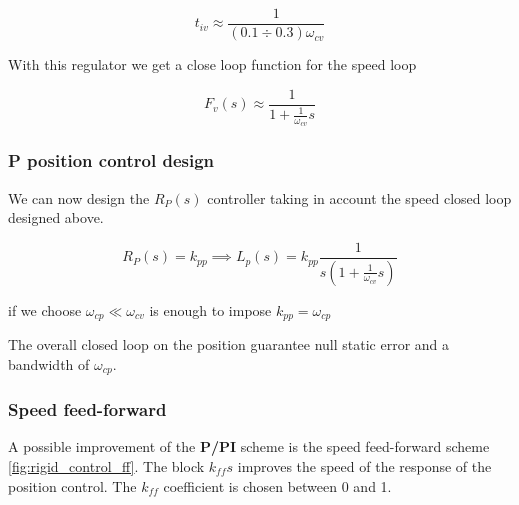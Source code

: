 \[ t_{iv} \approx \frac{1}{(0.1 \div 0.3)\omega_{cv}} \]

With this regulator we get a close loop function for the speed loop 

\[ F_v(s) \approx \frac{1}{1 + \frac{1}{\omega_{cv}}s} \]

\subsubsection{P position control design}

We can now design the $R_P(s)$ controller taking in account the speed closed loop designed above.

\[
R_{P}(s) = k_{pp} \implies
L_p(s) = k_{pp} \frac{1}{s \left(1 + \frac{1}{\omega_{cv}} s\right)}
\]

if we choose $\omega_{cp} \ll \omega_{cv}$ is enough to impose $k_{pp} = \omega_{cp}$

The overall closed loop on the position guarantee null static error and a bandwidth of $\omega_{cp}$.

\subsubsection{Speed feed-forward}

A possible improvement of the \textbf{P/PI} scheme is the speed feed-forward scheme \autoref{fig:rigid_control_ff}.
The block $k_{ff}s$ improves the speed of the response of the position control.
The $k_{ff}$ coefficient is chosen between 0 and 1.

